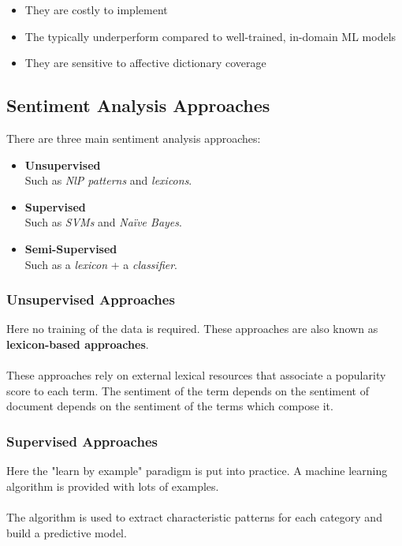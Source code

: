 \documentclass{article}
\begin{document}
\begin{itemize}
	\item They are costly to implement
	\item The typically underperform compared to well-trained, in-domain ML models
	\item They are sensitive to affective dictionary coverage
\end{itemize}

\subsection{Sentiment Analysis Approaches}
There are three main sentiment analysis approaches:

\begin{itemize}
	\item \textbf{Unsupervised}
	\vspace{.2cm} \\
	Such as \textit{NlP patterns} and \textit{lexicons}.
	
	\item \textbf{Supervised}
	\vspace{.2cm} \\
	Such as \textit{SVMs} and \textit{Naïve Bayes}.
	
	\item \textbf{Semi-Supervised}
	\vspace{.2cm} \\
	Such as a \textit{lexicon} + a \textit{classifier}.
\end{itemize}

\subsubsection{Unsupervised Approaches}
Here no training of the data is required. These approaches are also known as \textbf{lexicon-based approaches}. \\ \\
These approaches rely on external lexical resources that associate a popularity score to each term. The sentiment of the term depends on the sentiment of document depends on the sentiment of the terms which compose it.
\subsubsection{Supervised Approaches}
Here the "learn by example" paradigm is put into practice. A machine learning algorithm is provided with lots of examples. \\ \\
The algorithm is used to extract characteristic patterns for each category and build a predictive model.
\end{document}
